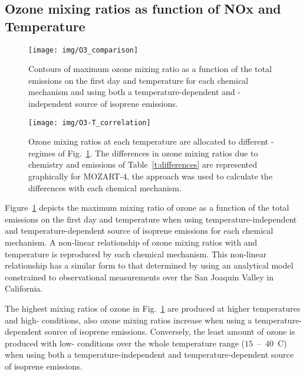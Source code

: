 \subsection{Ozone mixing ratios as function of NOx and Temperature} \label{ss:r_contours}

\begin{figure}%
    \centering%
    \caption{Contours of maximum ozone mixing ratio as a function of the total  emissions on the first day and temperature for each chemical mechanism and using both a temperature-dependent and -independent source of isoprene emissions.}
    \label{f:ozone_contours}%
    \texttt{[image: img/O3\_comparison]}%
\end{figure}

\begin{figure}[t]%
    \centering%
    \caption{Ozone mixing ratios at each temperature are allocated to different -regimes of Fig.~\ref{f:ozone_contours}. The differences in ozone mixing ratios due to chemistry and emissions of Table~\ref{t:differences} are represented graphically for MOZART-4, the approach was used to calculate the differences with each chemical mechanism.}%
    \label{f:O3-T}%
    \texttt{[image: img/O3-T\_correlation]}%
\end{figure}

\begin{table}%
    \centering%
    \caption{Increase in ozone mixing ratio (ppbv) due to chemistry and emissions at $40$~\degree C from reference temperature ($20$~\degree C) in the -regimes of Fig.~\ref{f:ozone_contours}.}%
    \label{t:differences}%
\end{table}

Figure~\ref{f:ozone_contours} depicts the maximum mixing ratio of ozone as a function of the total  emissions on the first day and temperature when using temperature-independent and temperature-dependent source of isoprene emissions for each chemical mechanism.
A non-linear relationship of ozone mixing ratios with  and temperature is reproduced by each chemical mechanism.
This non-linear relationship has a similar form to that determined by \citet{Pusede:2014} using an analytical model constrained to observational measurements over the San Joaquin Valley in California.

The highest mixing ratios of ozone in Fig.~\ref{f:ozone_contours} are produced at higher temperatures and high- conditions, also ozone mixing ratios increase when using a temperature-dependent source of isoprene emissions.
Conversely, the least amount of ozone is produced with low- conditions over the whole temperature range ($15$~--~$40$~\degree C) when using both a temperature-independent and temperature-dependent source of isoprene emissions.

